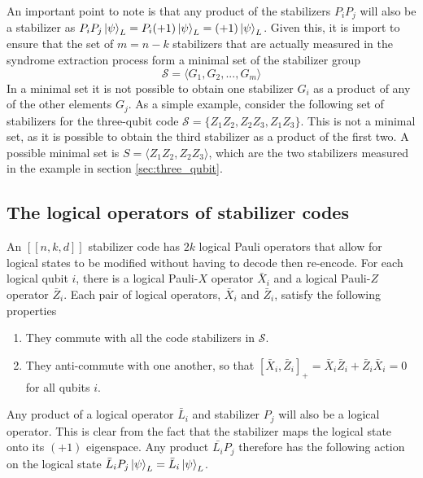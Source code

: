 \documentclass[]{arxiv}
\theoremstyle{plain}%
\theoremstyle{definition}
\theoremstyle{remark}
\begin{document}
An important point to note is that any product of the stabilizers $P_iP_j$ will also be a stabilizer as $P_iP_j\ket{\psi}_L=P_i(+1)\ket{\psi}_L=(+1)\ket{\psi}_L$. Given this, it is import to ensure that the set of $m=n-k$ stabilizers that are actually measured in the syndrome extraction process form a minimal set of the stabilizer group
%
\begin{equation}\label{eq:stab_generators}
\mathcal{S}=\langle G_1, G_2,...,G_m \rangle
\end{equation}
%
In a minimal set it is not possible to obtain one stabilizer $G_i$ as a product of any of the other elements $G_j$. As a simple example, consider the following set of stabilizers for the three-qubit code $\mathcal{S}=\{Z_1Z_2,Z_2Z_3,Z_1Z_3\}$. This is not a minimal set, as it is possible to obtain the third stabilizer as a product of the first two. A possible minimal set is $S=\langle Z_1Z_2,Z_2Z_3 \rangle$, which are the two stabilizers measured in the example in section \ref{sec:three_qubit}.


\subsection{The logical operators of stabilizer codes}\label{sec:logical_operators}


An $[[n,k,d]]$ stabilizer code has $2k$ logical Pauli operators that allow for logical states to be modified without having to decode then re-encode. For each logical qubit $i$, there is a logical Pauli-$X$ operator $\bar{X}_i$ and a logical Pauli-$Z$ operator $\bar{Z}_i$. Each pair of logical operators, $\bar{X}_i$ and $\bar{Z}_i$, satisfy the following properties
\begin{enumerate}
\item They commute with all the code stabilizers in $\mathcal{S}$.
\item They anti-commute with one another, so that $[\bar{X}_i,\bar{Z}_i]_{+}=\bar{X}_i\bar{Z}_i + \bar{Z}_i\bar{X}_i=0$ for all qubits $i$.
\end{enumerate}

Any product of a logical operator $\bar{L}_i$ and stabilizer $P_j$ will also be a logical operator. This is clear from the fact that the stabilizer maps the logical state onto its $(+1)$ eigenspace. Any product $\bar{L_i}P_j$ therefore has the following action on the logical state $\bar{L}_iP_j\ket{\psi}_L=\bar{L}_i\ket{\psi}_L$.
  
\end{document}
